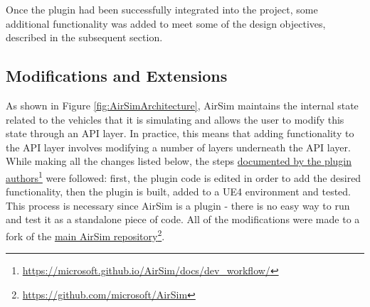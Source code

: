 Once the plugin had been successfully integrated into the project, some additional functionality was added to meet some of the design objectives, described in the subsequent section.

\subsection{Modifications and Extensions}

As shown in Figure \ref{fig:AirSimArchitecture}, AirSim maintains the internal state related to the vehicles that it is simulating and allows the user to modify this state through an API layer. In practice, this means that adding functionality to the API layer involves modifying a number of layers underneath the API layer. 
While making all the changes listed below, the steps
\href{https://microsoft.github.io/AirSim/docs/dev\_workflow/}{documented by the plugin authors}\footnote{\href{https://microsoft.github.io/AirSim/docs/dev\_workflow/}{https://microsoft.github.io/AirSim/docs/dev\_workflow/}}
were followed: first, the plugin code is edited in order to add the desired functionality, then the plugin is built, added to a UE4 environment and tested. This process is necessary since AirSim is a plugin - there is no easy way to run and test it as a standalone piece of code. All of the modifications were made to a fork of the \href{https://github.com/microsoft/AirSim}{main AirSim repository}\footnote{\href{https://github.com/microsoft/AirSim}{https://github.com/microsoft/AirSim}}.

